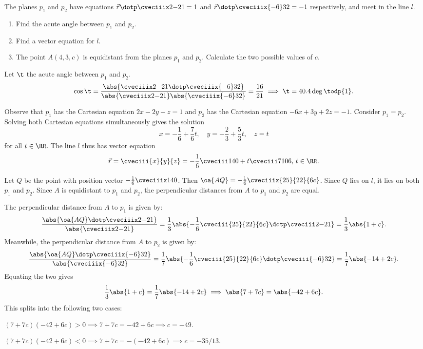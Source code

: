 \clearpage
\begin{problem}
    The planes $p_1$ and $p_2$ have equations $\vec r \dotp \cveciiix2{-2}1 = 1$ and $\vec r \dotp \cveciiix{-6}32 = -1$ respectively, and meet in the line $l$.

    \begin{enumerate}
        \item Find the acute angle between $p_1$ and $p_2$.
        \item Find a vector equation for $l$.
        \item The point $A(4, 3, c)$ is equidistant from the planes $p_1$ and $p_2$. Calculate the two possible values of $c$.
    \end{enumerate}
\end{problem}
\begin{solution}
    \begin{ppart}
        Let $\t$ the acute angle between $p_1$ and $p_2$. \[\cos\t = \frac{\abs{\cveciiix2{-2}1 \dotp \cveciiix{-6}32}}{\abs{\cveciiix2{-2}1} \abs{\cveciiix{-6}32}} = \frac{16}{21} \implies \t = 40.4 \deg \todp{1}.\]
    \end{ppart}
    \begin{ppart}
        Observe that $p_1$ has the Cartesian equation $2x-2y+z = 1$ and $p_2$ has the Cartesian equation $-6x + 3y + 2z = -1$. Consider $p_1 = p_2$. Solving both Cartesian equations simultaneously gives the solution \[ x = -\frac16 + \frac76t, \quad y = -\frac23 + \frac53 t, \quad z = t\] for all $t \in \RR$. The line $l$ thus has vector equation \[\vec r = \cveciii{x}{y}{z} = -\frac16\cveciii140 + t\cveciii7{10}6, \, t \in \RR.\]
    \end{ppart}
    \begin{ppart}
        Let $Q$ be the point with position vector $-\frac16 \cveciiix140$. Then $\oa{AQ} = -\frac16 \cveciiix{25}{22}{6c}$. Since $Q$ lies on $l$, it lies on both $p_1$ and $p_2$. Since $A$ is equidistant to $p_1$ and $p_2$, the perpendicular distances from $A$ to $p_1$ and $p_2$ are equal.

        The perpendicular distance from $A$ to $p_1$ is given by: \[\frac{\abs{\oa{AQ} \dotp \cveciiix2{-2}1}}{\abs{\cveciiix2{-2}1}} = \frac13 \abs{-\frac16 \cveciii{25}{22}{6c} \dotp \cveciii2{-2}1} = \frac13 \abs{1 + c}.\] Meanwhile, the perpendicular distance from $A$ to $p_2$ is given by: \[\frac{\abs{\oa{AQ} \dotp \cveciiix{-6}32}}{\abs{\cveciiix{-6}32}} = \frac17 \abs{-\frac16 \cveciii{25}{22}{6c} \dotp \cveciii{-6}32} = \frac17 \abs{-14 + 2c}.\] Equating the two gives \[\frac13 \abs{1 + c} = \frac17 \abs{-14 + 2c} \implies \abs{7 + 7c} = \abs{-42 + 6c}.\] This splits into the following two cases:

         $(7+7c)(-42+6c) > 0 \implies 7+7c = -42+6c \implies c = -49$.

         $(7+7c)(-42+6c) < 0 \implies 7+7c = -(-42+6c) \implies c = -35/13$.
    \end{ppart}
\end{solution}

